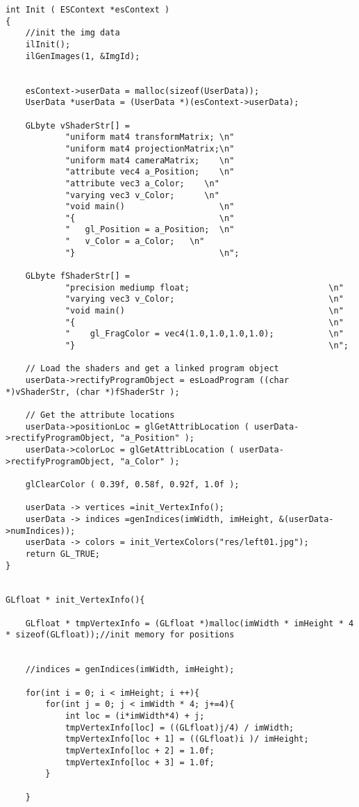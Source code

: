 \begin{verbatim}
int Init ( ESContext *esContext )
{
	//init the img data
	ilInit();
	ilGenImages(1, &ImgId);


	esContext->userData = malloc(sizeof(UserData));
	UserData *userData = (UserData *)(esContext->userData);

	GLbyte vShaderStr[] =
			"uniform mat4 transformMatrix; \n"
			"uniform mat4 projectionMatrix;\n"
			"uniform mat4 cameraMatrix;    \n"
			"attribute vec4 a_Position;    \n"
			"attribute vec3 a_Color;    \n"
			"varying vec3 v_Color;      \n"
			"void main()                   \n"
			"{                             \n"
			"   gl_Position = a_Position;  \n"
			"   v_Color = a_Color;   \n"
			"}                             \n";

	GLbyte fShaderStr[] =
			"precision mediump float;                            \n"
			"varying vec3 v_Color;                               \n"
			"void main()                                         \n"
			"{                                                   \n"
			"    gl_FragColor = vec4(1.0,1.0,1.0,1.0);           \n"
			"}                                                   \n";

	// Load the shaders and get a linked program object
	userData->rectifyProgramObject = esLoadProgram ((char *)vShaderStr, (char *)fShaderStr );

	// Get the attribute locations
	userData->positionLoc = glGetAttribLocation ( userData->rectifyProgramObject, "a_Position" );
	userData->colorLoc = glGetAttribLocation ( userData->rectifyProgramObject, "a_Color" );

	glClearColor ( 0.39f, 0.58f, 0.92f, 1.0f );

	userData -> vertices =init_VertexInfo();
	userData -> indices =genIndices(imWidth, imHeight, &(userData->numIndices));
	userData -> colors = init_VertexColors("res/left01.jpg");
	return GL_TRUE;
}


GLfloat * init_VertexInfo(){

	GLfloat * tmpVertexInfo = (GLfloat *)malloc(imWidth * imHeight * 4 * sizeof(GLfloat));//init memory for positions


	//indices = genIndices(imWidth, imHeight);

	for(int i = 0; i < imHeight; i ++){
		for(int j = 0; j < imWidth * 4; j+=4){
			int loc = (i*imWidth*4) + j;
			tmpVertexInfo[loc] = ((GLfloat)j/4) / imWidth;
			tmpVertexInfo[loc + 1] = ((GLfloat)i )/ imHeight;
			tmpVertexInfo[loc + 2] = 1.0f;
			tmpVertexInfo[loc + 3] = 1.0f;
		}

	}



\end{verbatim}
